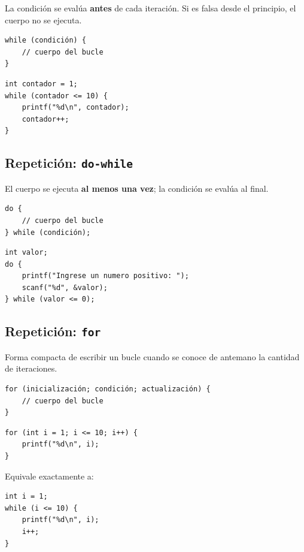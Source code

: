 La condición se evalúa \textbf{antes} de cada iteración. Si es falsa desde el principio, el cuerpo no se ejecuta.

\begin{lstlisting}[style=estilo-c]
while (condición) {
    // cuerpo del bucle
}
\end{lstlisting}

\begin{lstlisting}[style=estilo-c]
int contador = 1;
while (contador <= 10) {
    printf("%d\n", contador);
    contador++;
}
\end{lstlisting}

\subsection{Repetición: \texttt{do-while}}

El cuerpo se ejecuta \textbf{al menos una vez}; la condición se evalúa al final.

\begin{lstlisting}[style=estilo-c]
do {
    // cuerpo del bucle
} while (condición);
\end{lstlisting}

\begin{lstlisting}[style=estilo-c]
int valor;
do {
    printf("Ingrese un numero positivo: ");
    scanf("%d", &valor);
} while (valor <= 0);
\end{lstlisting}

\subsection{Repetición: \texttt{for}}

Forma compacta de escribir un bucle cuando se conoce de antemano la cantidad de iteraciones.

\begin{lstlisting}[style=estilo-c]
for (inicialización; condición; actualización) {
    // cuerpo del bucle
}
\end{lstlisting}

\begin{lstlisting}[style=estilo-c]
for (int i = 1; i <= 10; i++) {
    printf("%d\n", i);
}
\end{lstlisting}

Equivale exactamente a:

\begin{lstlisting}[style=estilo-c]
int i = 1;
while (i <= 10) {
    printf("%d\n", i);
    i++;
}
\end{lstlisting}

